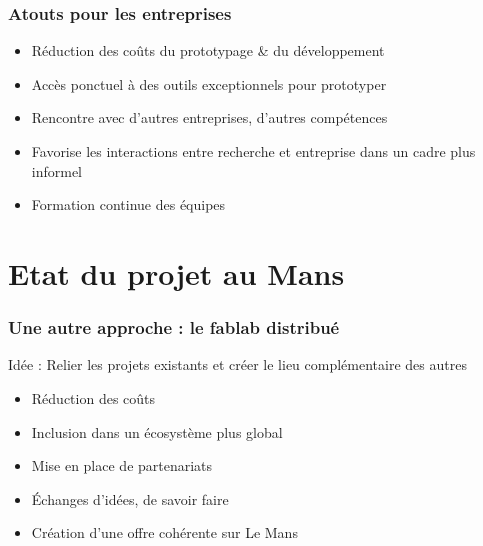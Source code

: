 \documentclass[10pt, compress]{beamer}
\begin{document}
	\begin{frame}
		\frametitle{Atouts pour les entreprises}

		\begin{itemize}
			\item \alert{Réduction des coûts} du prototypage \& du développement
			\item Accès ponctuel à des outils exceptionnels pour \alert{prototyper}
			\item Rencontre avec d'autres entreprises, d'\alert{autres compétences}
			\item Favorise les interactions entre recherche et entreprise dans un cadre plus informel
			\item \alert{Formation continue} des équipes
		\end{itemize}
	\end{frame}

	\section{Etat du projet au Mans}

	\begin{frame}
		\frametitle{Une autre approche : le fablab distribué}

		\begin{center}
			\alert{Idée :} Relier les projets existants et créer le lieu complémentaire des autres
		\end{center}

		\pause
		\begin{itemize}
			\item Réduction des coûts
			\item Inclusion dans un \alert{écosystème plus global}
			\item Mise en place de \alert{partenariats}
			\item \alert{Échanges d'idées}, de savoir faire
			\item Création d'une \alert{offre cohérente} sur Le Mans
		\end{itemize}
	\end{frame}
\end{document}
